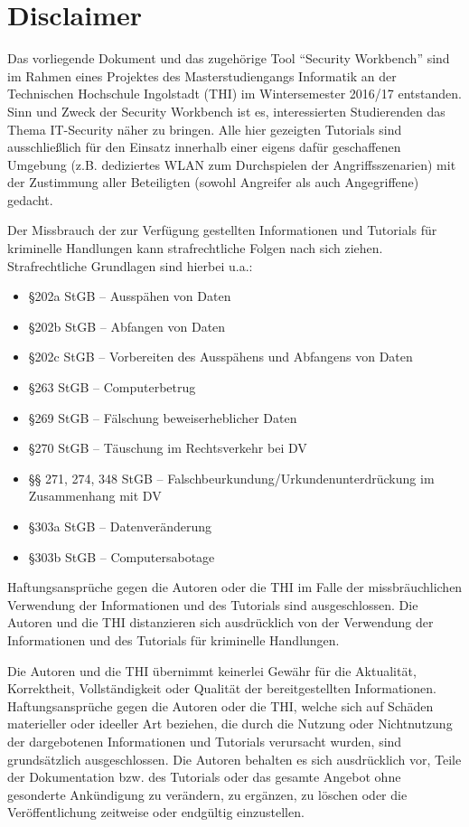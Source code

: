 \chapter{Disclaimer}
\label{ch:disclaimer}

Das vorliegende Dokument und das zugehörige Tool \enquote{Security Workbench} sind im Rahmen eines Projektes des Masterstudiengangs Informatik an der Technischen Hochschule Ingolstadt (THI) im Wintersemester 2016/17 entstanden. Sinn und Zweck der Security Workbench ist es, interessierten Studierenden das Thema IT-Security näher zu bringen. Alle hier gezeigten Tutorials sind ausschließlich für den Einsatz innerhalb einer eigens dafür geschaffenen Umgebung (z.B. dediziertes WLAN zum Durchspielen der Angriffsszenarien) mit der Zustimmung aller Beteiligten (sowohl Angreifer als auch Angegriffene) gedacht.

Der Missbrauch der zur Verfügung gestellten Informationen und Tutorials für kriminelle Handlungen kann strafrechtliche Folgen nach sich ziehen. Strafrechtliche Grundlagen sind hierbei u.a.:
\begin{itemize}
	\item§202a StGB – Ausspähen von Daten
	\item§202b StGB – Abfangen von Daten
	\item§202c StGB – Vorbereiten des Ausspähens und Abfangens von Daten
	\item§263 StGB – Computerbetrug
	\item§269 StGB – Fälschung beweiserheblicher Daten
	\item§270 StGB – Täuschung im Rechtsverkehr bei DV
	\item§§ 271, 274, 348 StGB – Falschbeurkundung/Urkundenunterdrückung im Zusammenhang mit DV
	\item§303a StGB – Datenveränderung
	\item§303b StGB – Computersabotage
\end{itemize}

Haftungsansprüche gegen die Autoren oder die THI im Falle der missbräuchlichen Verwendung der Informationen und des Tutorials sind ausgeschlossen. Die Autoren und die THI distanzieren sich ausdrücklich von der Verwendung der Informationen und des Tutorials für kriminelle Handlungen.

Die Autoren und die THI übernimmt keinerlei Gewähr für die Aktualität, Korrektheit, Vollständigkeit oder Qualität der bereitgestellten Informationen. Haftungsansprüche gegen die Autoren oder die THI, welche sich auf Schäden materieller oder ideeller Art beziehen, die durch die Nutzung oder Nichtnutzung der dargebotenen Informationen und Tutorials verursacht wurden, sind grundsätzlich ausgeschlossen. Die Autoren behalten es sich ausdrücklich vor, Teile der Dokumentation bzw. des Tutorials oder das gesamte Angebot ohne gesonderte Ankündigung zu verändern, zu ergänzen, zu löschen oder die Veröffentlichung zeitweise oder endgültig einzustellen.

